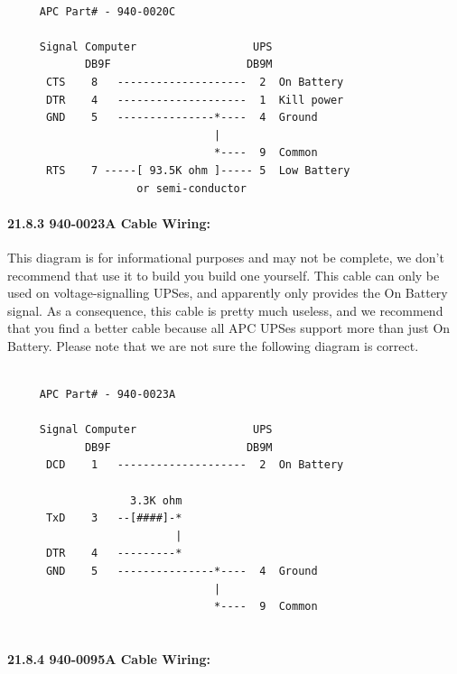 {{{{{{{{{{\footnotesize
\begin{verbatim}
     
     APC Part# - 940-0020C
     
     Signal Computer                  UPS
            DB9F                     DB9M
      CTS    8   --------------------  2  On Battery
      DTR    4   --------------------  1  Kill power
      GND    5   ---------------*----  4  Ground
                                |
                                *----  9  Common
      RTS    7 -----[ 93.5K ohm ]----- 5  Low Battery
                    or semi-conductor
\end{verbatim}
\normalsize

\label{940_002d0023A-Cable-Wiring}

\paragraph*{21.8.3 940-0023A Cable Wiring:}

\label{index-Cables-205}
This diagram is for informational purposes and may not be complete, we don't
recommend that use it to build you build one yourself.  This cable can only be
used on voltage-signalling UPSes, and apparently only provides the On Battery
signal. As a consequence, this cable is pretty much useless, and we recommend
that you find a better cable because all APC UPSes support more than just On
Battery. Please note that we are not sure the following diagram is correct. 

\footnotesize
\begin{verbatim}
     
     APC Part# - 940-0023A
     
     Signal Computer                  UPS
            DB9F                     DB9M
      DCD    1   --------------------  2  On Battery
     
                   3.3K ohm
      TxD    3   --[####]-*
                          |
      DTR    4   ---------*
      GND    5   ---------------*----  4  Ground
                                |
                                *----  9  Common
     
\end{verbatim}
\normalsize

\label{940_002d0095A-Cable-Wiring}

\paragraph*{21.8.4 940-0095A Cable Wiring:}

}}}}}}}}}}
